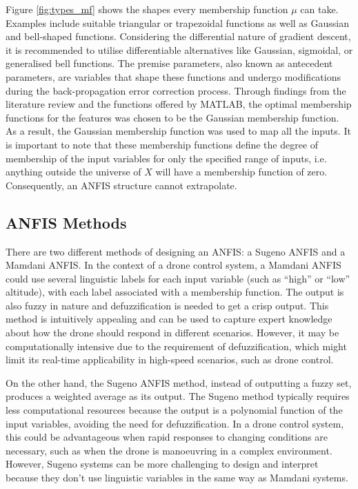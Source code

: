 Figure \ref{fig:types_mf} shows the shapes every membership function $\mu$ can take. Examples include suitable triangular or trapezoidal functions as well as Gaussian and bell-shaped functions. Considering the differential nature of gradient descent, it is recommended to utilise differentiable alternatives like Gaussian, sigmoidal, or generalised bell functions. The premise parameters, also known as antecedent parameters, are variables that shape these functions and undergo modifications during the back-propagation error correction process. Through findings from the literature review and the functions offered by MATLAB, the optimal membership functions for the features was chosen to be the Gaussian membership function. As a result, the Gaussian membership function was used to map all the inputs. It is important to note that these membership functions define the degree of membership of the input variables for only the specified range of inputs, i.e. anything outside the universe of $X$ will have a membership function of zero. Consequently, an ANFIS structure cannot extrapolate.  
\subsection{ANFIS Methods}
There are two different methods of designing an ANFIS: a Sugeno ANFIS and a Mamdani ANFIS. In the context of a drone control system, a Mamdani ANFIS could use several linguistic labels for each input variable (such as ``high'' or ``low'' altitude), with each label associated with a membership function. The output is also fuzzy in nature and defuzzification is needed to get a crisp output. This method is intuitively appealing and can be used to capture expert knowledge about how the drone should respond in different scenarios. However, it may be computationally intensive due to the requirement of defuzzification, which might limit its real-time applicability in high-speed scenarios, such as drone control. 

On the other hand, the Sugeno ANFIS method, instead of outputting a fuzzy set, produces a weighted average as its output. The Sugeno method typically requires less computational resources because the output is a polynomial function of the input variables, avoiding the need for defuzzification. In a drone control system, this could be advantageous when rapid responses to changing conditions are necessary, such as when the drone is manoeuvring in a complex environment. However, Sugeno systems can be more challenging to design and interpret because they don't use linguistic variables in the same way as Mamdani systems.

